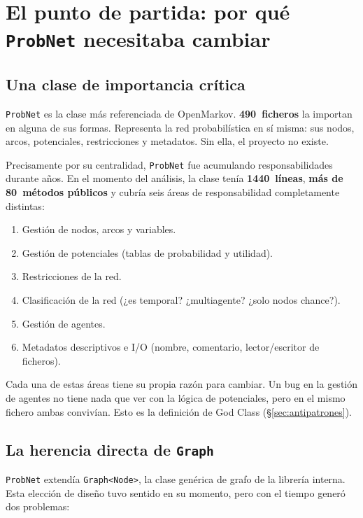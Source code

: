 \documentclass[11pt,a4paper]{article}
\newcommand{\code}[1]{\texttt{#1}}
\begin{document}
\section{El punto de partida: por qué \texttt{ProbNet} necesitaba cambiar}
\label{sec:punto-partida}

\subsection{Una clase de importancia crítica}

\code{ProbNet} es la clase más referenciada de OpenMarkov.
\textbf{490~ficheros} la importan en alguna de sus formas.  Representa la
red probabilística en sí misma: sus nodos, arcos, potenciales,
restricciones y metadatos.  Sin ella, el proyecto no existe.

Precisamente por su centralidad, \code{ProbNet} fue acumulando
responsabilidades durante años.  En el momento del análisis, la clase
tenía \textbf{1440~líneas}, \textbf{más de 80~métodos públicos} y
cubría seis áreas de responsabilidad completamente distintas:

\begin{enumerate}[nosep]
  \item Gestión de nodos, arcos y variables.
  \item Gestión de potenciales (tablas de probabilidad y utilidad).
  \item Restricciones de la red.
  \item Clasificación de la red (¿es temporal? ¿multiagente? ¿solo nodos chance?).
  \item Gestión de agentes.
  \item Metadatos descriptivos e I/O (nombre, comentario, lector/escritor de ficheros).
\end{enumerate}

Cada una de estas áreas tiene su propia razón para cambiar.  Un bug en la
gestión de agentes no tiene nada que ver con la lógica de potenciales, pero
en el mismo fichero ambas convivían.  Esto es la definición de God Class
(§\ref{sec:antipatrones}).

\subsection{La herencia directa de \texttt{Graph}}

\code{ProbNet} extendía \code{Graph<Node>}, la clase genérica de grafo
de la librería interna.  Esta elección de diseño tuvo sentido en su
momento, pero con el tiempo generó dos problemas:
\end{document}
